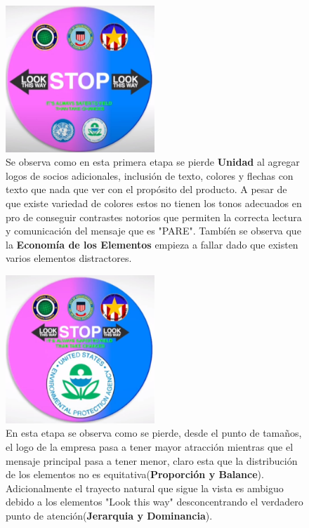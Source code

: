 \documentclass[a4paper,12pt]{article}
\begin{document}
\begin{figure}
\caption{Se observa como en esta primera etapa se pierde \textbf{Unidad} al agregar logos de socios adicionales, inclusión de texto, colores y flechas con texto que nada que ver con el propósito del producto. A pesar de que existe variedad de colores estos no tienen los tonos adecuados en pro de conseguir contrastes notorios que permiten la correcta lectura y comunicación del mensaje que es "PARE". Tambíén se observa que la \textbf{Economía de los Elementos} empieza a fallar dado que existen varios elementos distractores.}
\includegraphics[width=0.5\textwidth]{logop1}
\end{figure}

\begin{figure}
\caption{En esta etapa se observa como se pierde, desde el punto de tamaños, el logo de la empresa pasa a tener mayor atracción mientras que el mensaje principal pasa a tener menor, claro esta que la distribución de los elementos no es equitativa(\textbf{Proporción y Balance}). Adicionalmente el trayecto natural que sigue la vista es ambiguo debido a los elementos "Look this way" desconcentrando el verdadero punto de atención(\textbf{Jerarquia y Dominancia}).}
\includegraphics[width=0.5\textwidth]{logop2}
\end{figure}
\end{document}

